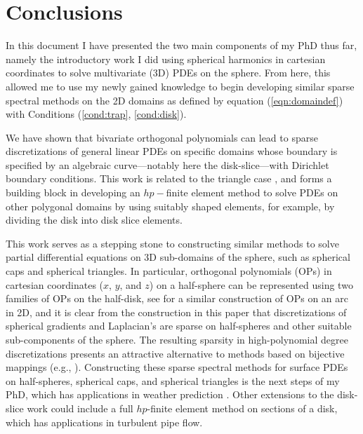 \documentclass[11pt, oneside]{article}   	%
\begin{document}


%
\section{Conclusions}

In this document I have presented the two main components of my PhD thus far, namely the introductory work I did using spherical harmonics in cartesian coordinates to solve multivariate (3D) PDEs on the sphere. From here, this allowed me to use my newly gained knowledge to begin developing similar sparse spectral methods on the 2D domains as defined by equation (\ref{eqn:domaindef}) with Conditions (\ref{cond:trap}, \ref{cond:disk}).

We have shown that bivariate orthogonal polynomials can lead to sparse discretizations of general linear PDEs on specific domains whose boundary is specified by an algebraic curve---notably here the disk-slice---with Dirichlet boundary conditions. This work is related to the triangle case \cite{olver2019triangle}, and forms a building block in developing an $hp-$finite element method to solve PDEs on other polygonal domains by using suitably shaped elements, for example, by dividing the disk into disk slice elements. 

This work serves as a stepping stone to constructing similar methods to solve partial differential equations on 3D sub-domains of the sphere, such as spherical caps and spherical triangles. In particular, orthogonal polynomials (OPs) in cartesian coordinates ($x$, $y$, and $z$) on a half-sphere can be represented using two families of OPs on the half-disk, see \cite[Theorem 3.1]{olver2018orthogonal} for a similar construction of OPs on an arc in 2D, and it is clear from the construction in this paper that discretizations of spherical gradients and Laplacian's are sparse on half-spheres and other suitable sub-components of the sphere. The resulting sparsity in high-polynomial degree discretizations presents an attractive alternative to methods based on bijective mappings (e.g., \cite{DGShallowWater,FEMShallowWater,boyd2005sphere}). Constructing these sparse spectral methods for surface PDEs on half-spheres, spherical caps, and spherical triangles is the next steps of my PhD, which has applications in weather prediction \cite{staniforth2012horizontal}. Other extensions to the disk-slice work could include a full $hp$-finite element method on sections of a disk, which has applications in turbulent pipe flow.
\end{document}
